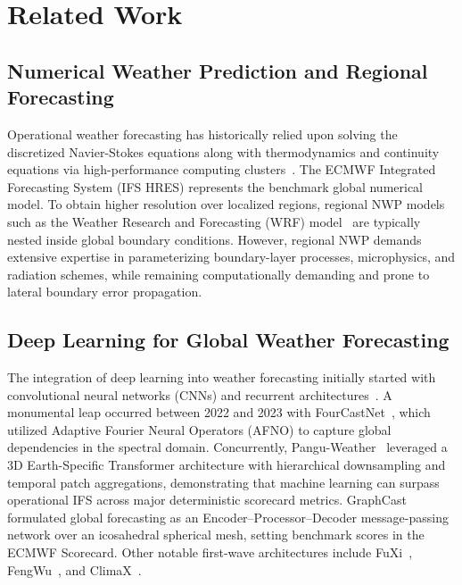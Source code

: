 \section{Related Work}
\label{sec:related}

\subsection{Numerical Weather Prediction and Regional Forecasting}
Operational weather forecasting has historically relied upon solving the discretized Navier-Stokes equations along with thermodynamics and continuity equations via high-performance computing clusters~\cite{bauer2015quiet, lynch2008origins}. The ECMWF Integrated Forecasting System (IFS HRES) represents the benchmark global numerical model. To obtain higher resolution over localized regions, regional NWP models such as the Weather Research and Forecasting (WRF) model~\cite{skamarock2008description} are typically nested inside global boundary conditions. However, regional NWP demands extensive expertise in parameterizing boundary-layer processes, microphysics, and radiation schemes, while remaining computationally demanding and prone to lateral boundary error propagation.

\subsection{Deep Learning for Global Weather Forecasting}
The integration of deep learning into weather forecasting initially started with convolutional neural networks (CNNs) and recurrent architectures~\cite{weyn2020improving, rasp2020weatherbench}. A monumental leap occurred between 2022 and 2023 with FourCastNet~\cite{pathak2022fourcastnet}, which utilized Adaptive Fourier Neural Operators (AFNO) to capture global dependencies in the spectral domain. Concurrently, Pangu-Weather~\cite{bi2023accurate} leveraged a 3D Earth-Specific Transformer architecture with hierarchical downsampling and temporal patch aggregations, demonstrating that machine learning can surpass operational IFS across major deterministic scorecard metrics. GraphCast~\cite{lam2023learning} formulated global forecasting as an Encoder--Processor--Decoder message-passing network over an icosahedral spherical mesh, setting benchmark scores in the ECMWF Scorecard. Other notable first-wave architectures include FuXi~\cite{chen2023fuxi}, FengWu~\cite{chen2023fengwu}, and ClimaX~\cite{nguyen2023climax}.

